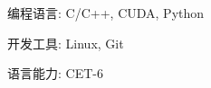 


\begin{cvskills}


\cvskill
{编程语言:} %
{C/C++, CUDA, Python} %


\cvskill
{开发工具:} %
{Linux, Git} %


\cvskill
{语言能力:} %
{CET-6} %


\end{cvskills}


